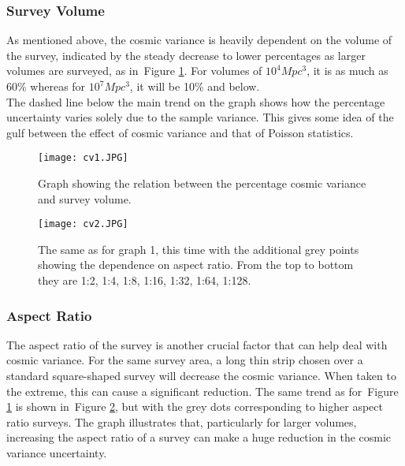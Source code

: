 \documentclass [a4paper, 12pt] {article}
\begin{document}
\subsubsection{Survey Volume}
As mentioned above, the cosmic variance is heavily dependent on the volume of the survey, indicated by the steady decrease to lower percentages as larger volumes are surveyed, as in~Figure \ref{fig:cv1}.  For volumes of $10^4 Mpc^3$, it is as much as 60\% whereas for $10^7Mpc^3$, it will be 10\% and below.
\\
\newline
The dashed line below the main trend on the graph shows how the percentage uncertainty varies solely due to the sample variance. This gives some idea of the gulf between the effect of cosmic variance and that of Poisson statistics.

\begin{figure}
\begin{center}
\texttt{[image: cv1.JPG]}
\end{center}
\caption{Graph showing the relation between the percentage cosmic variance and survey volume.}\label{fig:cv1}
\end{figure}

\begin{figure}
\begin{center}
\texttt{[image: cv2.JPG]}
\end{center}
\caption{The same as for graph 1, this time with the additional grey points showing the dependence on aspect ratio. From the top to bottom they are 1:2, 1:4, 1:8, 1:16, 1:32, 1:64, 1:128.}\label{fig:cv2}
\end{figure}
\subsubsection {Aspect Ratio}

The aspect ratio of the survey is another crucial factor that can help deal with cosmic variance. For the same survey area, a long thin strip chosen over a standard square-shaped survey will decrease the cosmic variance. When taken to the extreme, this can cause a significant reduction. The same trend as for~Figure \ref{fig:cv1} is shown in~Figure \ref{fig:cv2}, but with the grey dots corresponding to higher aspect ratio surveys. The graph illustrates that, particularly for larger volumes, increasing the aspect ratio of a survey can make a huge reduction in the cosmic variance uncertainty.
\end{document}
